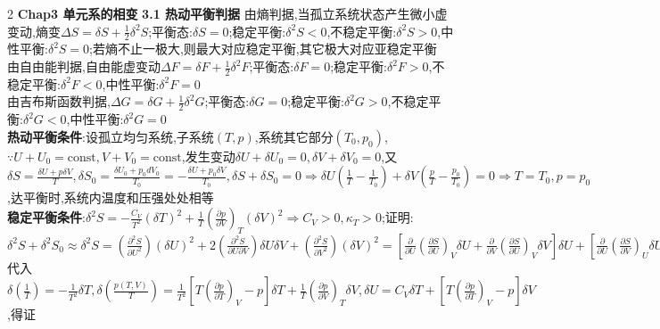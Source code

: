 \documentclass[10pt,a4paper]{article}
\begin{document}
\begin{multicols}{2}
\noindent\textbf{Chap3 单元系的相变}
\textbf{3.1 热动平衡判据}
由熵判据,当孤立系统状态产生微小虚变动,熵变$\Delta S=\delta S+\frac{1}{2}\delta^2S$;平衡态:$\delta S=0$;稳定平衡:$\delta^2S<0$,不稳定平衡:$\delta^2S>0$,中性平衡:$\delta^2S=0$;若熵不止一极大,则最大对应稳定平衡,其它极大对应亚稳定平衡\\
由自由能判据,自由能虚变动$\Delta F=\delta F+\frac{1}{2}\delta^2F$;平衡态:$\delta F=0$;稳定平衡:$\delta^2F>0$,不稳定平衡:$\delta^2F<0$,中性平衡:$\delta^2F=0$\\
由吉布斯函数判据,$\Delta G=\delta G+\frac{1}{2}\delta^2G$;平衡态:$\delta G=0$;稳定平衡:$\delta^2G>0$,不稳定平衡:$\delta^2G<0$,中性平衡:$\delta^2G=0$\\
\textbf{热动平衡条件}:设孤立均匀系统,子系统$(T,p)$,系统其它部分$(T_0,p_0)$,$\because U+U_0=\text{const},V+V_0=\text{const}$,发生变动$\delta U+\delta U_0=0,\delta V+\delta V_0=0$,又$\delta S=\frac{\delta U+p\delta V}{T},\delta S_0=\frac{\delta U_0+p_0dV_0}{T_0}=-\frac{\delta U+p_0\delta V}{T_0},\delta S+\delta S_0=0\Rightarrow\delta U(\frac{1}{T}-\frac{1}{T_0})+\delta V(\frac{p}{T}-\frac{p_0}{T_0})=0\Rightarrow T=T_0,p=p_0$,达平衡时,系统内温度和压强处处相等\\
\textbf{稳定平衡条件}:$\delta^2S=-\frac{C_V}{T^2}(\delta T)^2+\frac{1}{T}\left(\frac{\partial p}{\partial V}\right)_T(\delta V)^2\Rightarrow C_V>0,\kappa_T>0$;证明:$\delta^2S+\delta^2S_0\approx\delta^2S=\left(\frac{\partial^2S}{\partial U^2}\right)(\delta U)^2+2\left(\frac{\partial^2S}{\partial U\partial V}\right)\delta U\delta V+\left(\frac{\partial^2S}{\partial V^2}\right)(\delta V)^2=\left[\frac{\partial}{\partial U}\left(\frac{\partial S}{\partial U}\right)_V\delta U+\frac{\partial}{\partial V}\left(\frac{\partial S}{\partial U}\right)_V\delta V\right]\delta U+\left[\frac{\partial}{\partial U}\left(\frac{\partial S}{\partial V}\right)_U\delta U+\frac{\partial}{\partial V}\left(\frac{\partial S}{\partial V}\right)_U\delta V\right]\delta V=\left[\frac{\partial}{\partial U}\left(\frac{1}{T}\right)\delta U+\frac{\partial}{\partial V}\left(\frac{1}{T}\right)\delta V\right]\delta U+\left[\frac{\partial}{\partial U}\left(\frac{p}{T}\right)\delta U+\frac{\partial}{\partial V}\left(\frac{p}{T}\right)\delta V\right]\delta V=\delta\left(\frac{1}{T}\right)\delta U+\delta\left(\frac{p}{T}\right)\delta V,$代入$\delta\left(\frac{1}{T}\right)=-\frac{1}{T^2}\delta T,\delta\left(\frac{p(T,V)}{T}\right)=\frac{1}{T^2}\left[T\left(\frac{\partial p}{\partial T}\right)_V-p\right]\delta T+\frac{1}{T}\left(\frac{\partial p}{\partial V}\right)_T\delta V,\delta U=C_V\delta T+\left[T\left(\frac{\partial p}{\partial T}\right)_V-p\right]\delta V$,得证\\

\end{multicols}
\end{document}

